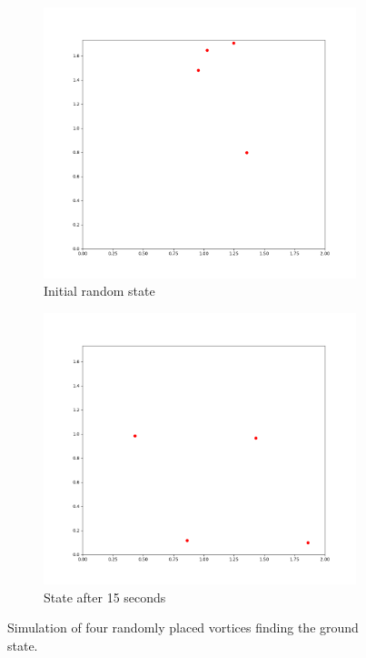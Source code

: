 \documentclass{article}
\numberwithin{equation}{section}
\begin{document}
\begin{figure}[htb]
\centering
\begin{subfigure}[t]{.49\textwidth}
    \centering
    \includegraphics[width=.9\linewidth]{results/gifs/Basic_tests/ground_state_rand_000.png}
    \caption{Initial random state}
    \label{fig:ground_rand_000}
\end{subfigure}
\hfill
\begin{subfigure}[t]{.49\textwidth}
    \centering
\includegraphics[width=.9\linewidth]{results/gifs/Basic_tests/ground_state_rand_749.png}
    \caption{State after 15 seconds}
    \label{fig:ground_rand_749}
\end{subfigure}
\caption{Simulation of four randomly placed vortices finding the ground state.}
\label{fig:ground_rand}
\end{figure}
\end{document}
